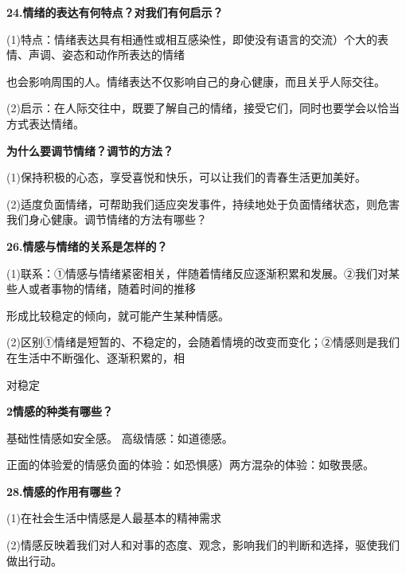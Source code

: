 \documentclass[lang=cn,11pt]{elegantbook}
\newcommand{\daofasym}[1]{{\daofasymbolfont #1}}
\newcommand{\daofasym}[1]{#1}
\begin{document}
\textbf{24.情绪的表达有何特点？对我们有何启示？}\par

(1)特点：情绪表达具有相通性或相互感染性，即使没有语言的交流）个大的表情、声调、姿态和动作所表达的情绪\par

也会影响周围的人。情绪表达不仅影响自己的身心健康，而且关乎人际交往。\par

(2)启示：在人际交往中，既要了解自己的情绪，接受它们，同时也要学会以恰当方式表达情绪。\par

\textbf{为什么要调节情绪？调节的方法？}\par

(1)保持积极的心态，享受喜悦和快乐，可以让我们的青春生活更加美好。\par

(2)适度负面情绪，可帮助我们适应突发事件，持续地处于负面情绪状态，则危害我们身心健康。调节情绪的方法有哪些？\par

\textbf{26.情感与情绪的关系是怎样的？}\par

(1)联系：\daofasym{①}情感与情绪紧密相关，伴随着情绪反应逐渐积累和发展。\daofasym{②}我们对某些人或者事物的情绪，随着时间的推移\par

形成比较稳定的倾向，就可能产生某种情感。\par

(2)区别\daofasym{①}情绪是短暂的、不稳定的，会随着情境的改变而变化；\daofasym{②}情感则是我们在生活中不断强化、逐渐积累的，相\par

对稳定\par

\textbf{2情感的种类有哪些？}\par

基础性情感如安全感。 高级情感：如道德感。\par

正面的体验爱的情感负面的体验：如恐惧感）两方混杂的体验：如敬畏感。\par

\textbf{28.情感的作用有哪些？}\par

(1)在社会生活中情感是人最基本的精神需求\par

(2)情感反映着我们对人和对事的态度、观念，影响我们的判断和选择，驱使我们做出行动。\par
\end{document}
